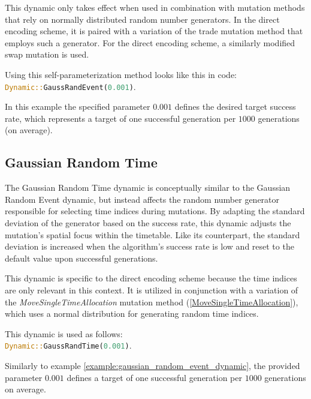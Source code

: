 \documentclass[english,examples]{isasthesis}
\begin{document}
This dynamic only takes effect when used in combination with mutation methods
that rely on normally distributed random number generators. In the direct
encoding scheme, it is paired with a variation of the trade mutation method
that employs such a generator. For the direct encoding scheme, a similarly
modified swap mutation is used.

\begin{minipage}{\textwidth}
    \begin{Example}
        Using this self-parameterization method looks like this in code:\\
        \lstinline[language=Rust]|Dynamic::GaussRandEvent(0.001)|.

        In this example the specified parameter $0.001$ defines the desired
        target success rate, which represents a target of one successful
        generation per $1000$ generations (on average).

        \label{example:gaussian_random_event_dynamic}
    \end{Example}
\end{minipage}

\subsection{Gaussian Random Time}
\label{GaussianRandomTime}
The Gaussian Random Time dynamic is conceptually similar to the Gaussian Random
Event dynamic, but instead affects the random number generator responsible for
selecting time indices during mutations. By adapting the standard deviation of
the generator based on the success rate, this dynamic adjusts the mutation's
spatial focus within the timetable. Like its counterpart, the standard deviation
is increased when the algorithm's success rate is low and reset to the default
value upon successful generations.

This dynamic is specific to the direct encoding scheme because the time indices
are only relevant in this context. It is utilized in conjunction with a
variation of the \textit{MoveSingleTimeAllocation} mutation method
(\ref{MoveSingleTimeAllocation}), which uses a normal distribution for
generating random time indices.

\begin{minipage}{\textwidth}
    \begin{Example}
        This dynamic is used as follows:\\
        \lstinline[language=Rust]|Dynamic::GaussRandTime(0.001)|.

        Similarly to example \ref{example:gaussian_random_event_dynamic}, the
        provided parameter $0.001$ defines a target of one successful
        generation per $1000$ generations on average.
    \end{Example}
\end{minipage}
\end{document}
